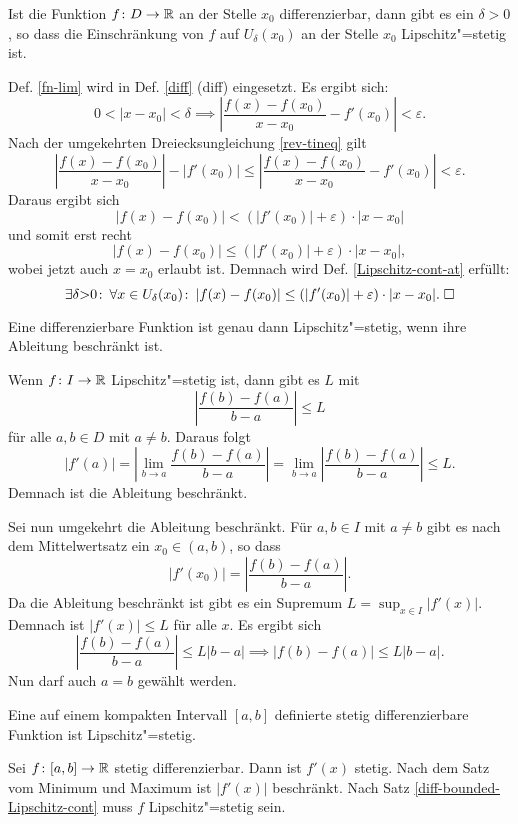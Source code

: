 \begin{Satz}\label{diff-nh-Lipschitz-cont-at}
Ist die Funktion $f\colon D\to\mathbb R$ an der Stelle $x_0$ differenzierbar,
dann gibt es ein $\delta>0$, so dass die Einschränkung von $f$
auf $U_\delta(x_0)$ an der Stelle $x_0$ Lipschitz"=stetig ist.
\end{Satz}

\begin{Beweis}
Def. \ref{fn-lim} wird in Def. \ref{diff} (diff) eingesetzt.
Es ergibt sich:
\[0<|x-x_0|<\delta\implies
\left|\frac{f(x)-f(x_0)}{x-x_0}-f'(x_0)\right|<\varepsilon.\]
Nach der umgekehrten Dreiecksungleichung \ref{rev-tineq} gilt
\[\left|\frac{f(x)-f(x_0)}{x-x_0}\right|-|f'(x_0)| \le
\left|\frac{f(x)-f(x_0)}{x-x_0}-f'(x_0)\right|
< \varepsilon.\]
Daraus ergibt sich
\[|f(x)-f(x_0)| < (|f'(x_0)|+\varepsilon)\cdot |x-x_0|\]
und somit erst recht
\[|f(x)-f(x_0)| \le (|f'(x_0)|+\varepsilon)\cdot |x-x_0|,\]
wobei jetzt auch $x=x_0$ erlaubt ist. Demnach wird Def.
\ref{Lipschitz-cont-at} erfüllt:
\[\exists \delta{>}0\colon\,\forall x\in U_\delta(x_0)\colon\,
|f(x)-f(x_0)| \le (|f'(x_0)|+\varepsilon)\cdot |x-x_0|.\;\square\]
\end{Beweis}

\begin{Satz}\label{diff-bounded-Lipschitz-cont}
Eine differenzierbare Funktion ist genau dann Lipschitz"=stetig,
wenn ihre Ableitung beschränkt ist.
\end{Satz}
\begin{Beweis}
Wenn $f\colon I\to\mathbb R$ Lipschitz"=stetig ist, dann gibt es $L$ mit
\[\left|\frac{f(b)-f(a)}{b-a}\right|\le L\]
für alle $a,b\in D$ mit $a\ne b$. Daraus folgt
\[|f'(a)| = \left|\lim_{b\to a} \frac{f(b)-f(a)}{b-a}\right|
= \lim_{b\to a} \left|\frac{f(b)-f(a)}{b-a}\right|
\le L.\]
Demnach ist die Ableitung beschränkt.

Sei nun umgekehrt die Ableitung beschränkt. Für $a,b\in I$ mit $a\ne b$
gibt es nach dem Mittelwertsatz ein $x_0\in(a,b)$, so dass
\[|f'(x_0)| = \left|\frac{f(b)-f(a)}{b-a}\right|.\]
Da die Ableitung beschränkt ist gibt es ein Supremum
$L = \sup_{x\in I} |f'(x)|$. Demnach ist $|f'(x)|\le L$ für alle $x$.
Es ergibt sich
\[\left|\frac{f(b)-f(a)}{b-a}\right|\le L|b-a| \implies |f(b)-f(a)|\le L|b-a|.\]
Nun darf auch $a=b$ gewählt werden.\;\qedsymbol
\end{Beweis}

\begin{Satz}\label{diff-compact-Lipschitz-cont}
Eine auf einem kompakten Intervall $[a,b]$ definierte stetig
differenzierbare Funktion ist Lipschitz"=stetig.
\end{Satz}
\begin{Beweis}
Sei $f\colon [a,b]\to\mathbb R$ stetig differenzierbar. Dann ist $f'(x)$ stetig.
Nach dem Satz vom Minimum und Maximum ist $|f'(x)|$ beschränkt. Nach
Satz \ref{diff-bounded-Lipschitz-cont} muss $f$ Lipschitz"=stetig
sein.\;\qedsymbol
\end{Beweis}

